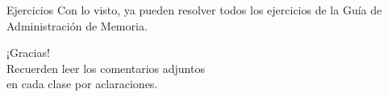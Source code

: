 \documentclass[aspectratio=169]{beamer}
\begin{document}
\begin{frame}{Ejercicios}
    \vfill
    Con lo visto, ya pueden resolver todos los ejercicios de la Guía de Administración de Memoria.
    \vfill
\end{frame}

\begin{frame}[plain]
    \begin{center}
    \vspace{2cm}
    \huge ¡Gracias!\\
    \vspace{2cm}
    \normalsize Recuerden leer los comentarios adjuntos\\ en cada clase por aclaraciones.
    \end{center}
\end{frame}
\end{document}
